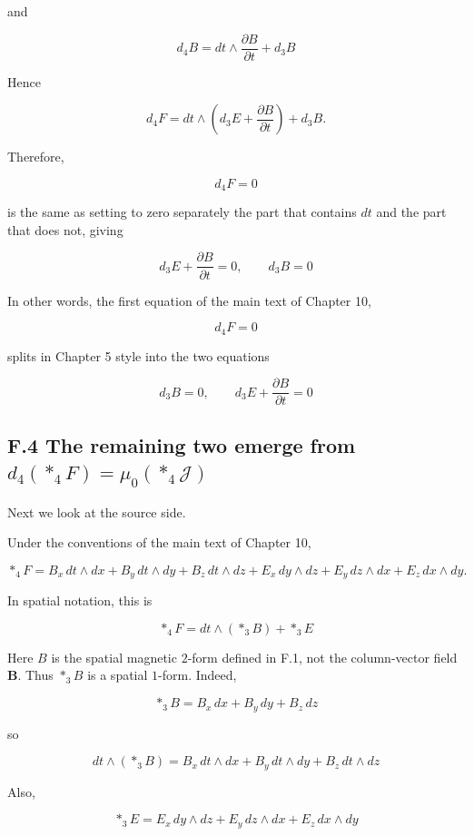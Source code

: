 \documentclass[a4paper,12pt,openany]{book}
\begin{document}
and

\[
d_4B=dt\wedge\frac{\partial B}{\partial t}+d_3B
\]

Hence

\[
d_4F=dt\wedge\left(d_3E+\frac{\partial B}{\partial t}\right)+d_3B.
\]

Therefore,

\[
d_4F=0
\]

is the same as setting to zero separately the part that contains \(dt\)
and the part that does not, giving

\[
d_3E+\frac{\partial B}{\partial t}=0,
\qquad
d_3B=0
\]

In other words, the first equation of the main text of Chapter 10,

\[
d_4F=0
\]

splits in Chapter 5 style into the two equations

\[
d_3B=0,
\qquad
d_3E+\frac{\partial B}{\partial t}=0
\]

\hypertarget{f.4-the-remaining-two-emerge-from-d_4ast_4fmu_0ast_4mathcal-j}{%
\subsection*{\texorpdfstring{F.4 The remaining two emerge from
\(d_4(\ast_4F)=\mu_0(\ast_4\mathcal J)\)}{F.4 The remaining two emerge from d\_4(\textbackslash ast\_4F)=\textbackslash mu\_0(\textbackslash ast\_4\textbackslash mathcal J)}}\label{f.4-the-remaining-two-emerge-from-d_4ast_4fmu_0ast_4mathcal-j}}

Next we look at the source side.

Under the conventions of the main text of Chapter 10,

\[
\ast_4F= B_x\,dt\wedge dx+B_y\,dt\wedge dy+B_z\,dt\wedge dz+E_x\,dy\wedge dz+E_y\,dz\wedge dx+E_z\,dx\wedge dy.
\]

In spatial notation, this is

\[
\ast_4F=dt\wedge(\ast_3B)+\ast_3E
\]

Here \(B\) is the spatial magnetic \(2\)-form defined in F.1, not the
column-vector field \(\mathbf{B}\). Thus \(\ast_3B\) is a spatial
\(1\)-form. Indeed,

\[
\ast_3B=B_x\,dx+B_y\,dy+B_z\,dz
\]

so

\[
dt\wedge(\ast_3B)=B_x\,dt\wedge dx+B_y\,dt\wedge dy+B_z\,dt\wedge dz
\]

Also,

\[
\ast_3E=E_x\,dy\wedge dz+E_y\,dz\wedge dx+E_z\,dx\wedge dy
\]
\end{document}
